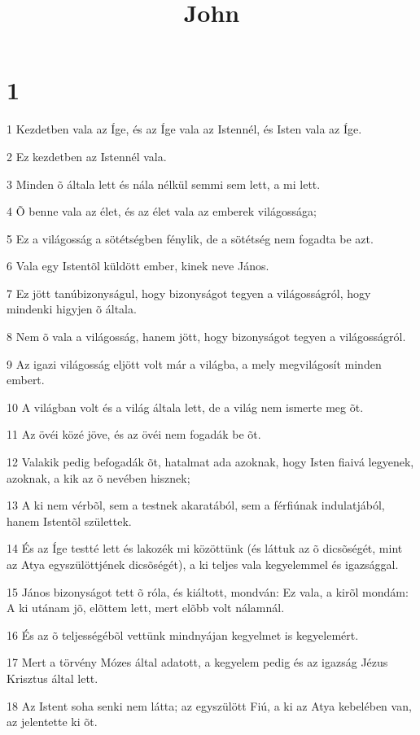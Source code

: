 

\title{John}


\chapter{1}

\par 1 Kezdetben vala az Íge, és az Íge vala az Istennél, és Isten vala az Íge.
\par 2 Ez kezdetben az Istennél vala.
\par 3 Minden õ általa lett és nála nélkül semmi sem lett, a mi lett.
\par 4 Õ benne vala az élet, és az élet vala az emberek világossága;
\par 5 Ez a világosság a sötétségben fénylik, de a sötétség nem fogadta be azt.
\par 6 Vala egy Istentõl küldött ember, kinek neve János.
\par 7 Ez jött tanúbizonyságul, hogy bizonyságot tegyen a világosságról, hogy mindenki higyjen õ általa.
\par 8 Nem õ vala a világosság, hanem jött, hogy bizonyságot tegyen a világosságról.
\par 9 Az igazi világosság eljött volt már a világba, a mely megvilágosít minden embert.
\par 10 A világban volt és a világ általa lett, de a világ nem ismerte meg õt.
\par 11 Az övéi közé jöve, és az övéi nem fogadák be õt.
\par 12 Valakik pedig befogadák õt, hatalmat ada azoknak, hogy Isten fiaivá legyenek, azoknak, a kik az õ nevében hisznek;
\par 13 A ki nem vérbõl, sem a testnek akaratából, sem a férfiúnak indulatjából, hanem Istentõl születtek.
\par 14 És az Íge testté lett és lakozék mi közöttünk (és láttuk az õ dicsõségét, mint az Atya egyszülöttjének dicsõségét), a ki teljes vala kegyelemmel és igazsággal.
\par 15 János bizonyságot tett õ róla, és kiáltott, mondván: Ez vala, a kirõl mondám: A ki utánam jõ, elõttem lett, mert elõbb volt nálamnál.
\par 16 És az õ teljességébõl vettünk mindnyájan kegyelmet is kegyelemért.
\par 17 Mert a törvény Mózes által adatott, a kegyelem pedig és az igazság Jézus Krisztus által lett.
\par 18 Az Istent soha senki nem látta; az egyszülött Fiú, a ki az Atya kebelében van, az jelentette ki õt.
